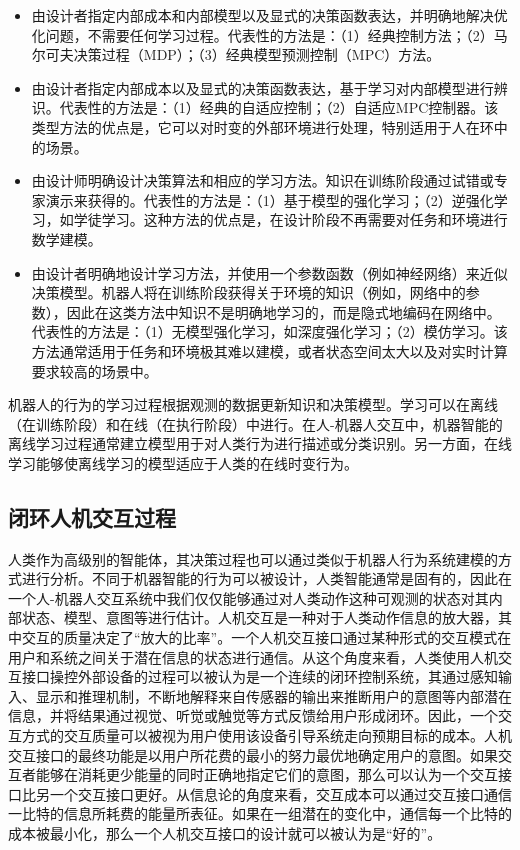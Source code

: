 \begin{itemize}
\item 由设计者指定内部成本和内部模型以及显式的决策函数表达，并明确地解决优化问题，不需要任何学习过程。代表性的方法是：（1）经典控制方法；（2）马尔可夫决策过程（MDP）；（3）经典模型预测控制（MPC）方法。
\item 由设计者指定内部成本以及显式的决策函数表达，基于学习对内部模型进行辨识。代表性的方法是：（1）经典的自适应控制；（2）自适应MPC控制器。该类型方法的优点是，它可以对时变的外部环境进行处理，特别适用于人在环中的场景。
\item 由设计师明确设计决策算法和相应的学习方法。知识在训练阶段通过试错或专家演示来获得的。代表性的方法是：（1）基于模型的强化学习；（2）逆强化学习，如学徒学习。这种方法的优点是，在设计阶段不再需要对任务和环境进行数学建模。
\item 由设计者明确地设计学习方法，并使用一个参数函数（例如神经网络）来近似决策模型。机器人将在训练阶段获得关于环境的知识（例如，网络中的参数），因此在这类方法中知识不是明确地学习的，而是隐式地编码在网络中。代表性的方法是：（1）无模型强化学习，如深度强化学习；（2）模仿学习。该方法通常适用于任务和环境极其难以建模，或者状态空间太大以及对实时计算要求较高的场景中。
\end{itemize}

机器人的行为的学习过程根据观测的数据更新知识和决策模型。学习可以在离线（在训练阶段）和在线（在执行阶段）中进行。在人-机器人交互中，机器智能的离线学习过程通常建立模型用于对人类行为进行描述或分类识别。另一方面，在线学习能够使离线学习的模型适应于人类的在线时变行为。
\subsection{闭环人机交互过程}
人类作为高级别的智能体，其决策过程也可以通过类似于机器人行为系统建模的方式进行分析。不同于机器智能的行为可以被设计，人类智能通常是固有的，因此在一个人-机器人交互系统中我们仅仅能够通过对人类动作这种可观测的状态对其内部状态、模型、意图等进行估计。人机交互是一种对于人类动作信息的放大器，其中交互的质量决定了``放大的比率''\cite{williamsonContinuousUncertainInteraction2006}。一个人机交互接口通过某种形式的交互模式在用户和系统之间关于潜在信息的状态进行通信。从这个角度来看，人类使用人机交互接口操控外部设备的过程可以被认为是一个连续的闭环控制系统，其通过感知输入、显示和推理机制，不断地解释来自传感器的输出来推断用户的意图等内部潜在信息，并将结果通过视觉、听觉或触觉等方式反馈给用户形成闭环。因此，一个交互方式的交互质量可以被视为用户使用该设备引导系统走向预期目标的成本。人机交互接口的最终功能是以用户所花费的最小的努力最优地确定用户的意图。如果交互者能够在消耗更少能量的同时正确地指定它们的意图，那么可以认为一个交互接口比另一个交互接口更好。从信息论的角度来看，交互成本可以通过交互接口通信一比特的信息所耗费的能量所表征。如果在一组潜在的变化中，通信每一个比特的成本被最小化，那么一个人机交互接口的设计就可以被认为是``好的''。

